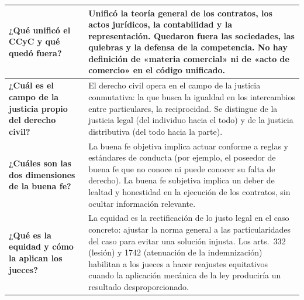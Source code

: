 \documentclass[12pt,oneside]{book}
\begin{document}
\begin{longtable}{|p{}|p{}|}
\textbf{¿Qué unificó el CCyC y qué quedó fuera?} & Unificó la teoría general de los contratos, los actos jurídicos, la contabilidad y la representación. Quedaron fuera las sociedades, las quiebras y la defensa de la competencia. No hay definición de «materia comercial» ni de «acto de comercio» en el código unificado. \\
\hline

\textbf{¿Cuál es el campo de la justicia propio del derecho civil?} & El derecho civil opera en el campo de la justicia conmutativa: la que busca la igualdad en los intercambios entre particulares, la reciprocidad. Se distingue de la justicia legal (del individuo hacia el todo) y de la justicia distributiva (del todo hacia la parte). \\
\hline

\textbf{¿Cuáles son las dos dimensiones de la buena fe?} & La buena fe objetiva implica actuar conforme a reglas y estándares de conducta (por ejemplo, el poseedor de buena fe que no conoce ni puede conocer su falta de derecho). La buena fe subjetiva implica un deber de lealtad y honestidad en la ejecución de los contratos, sin ocultar información relevante. \\
\hline

\textbf{¿Qué es la equidad y cómo la aplican los jueces?} & La equidad es la rectificación de lo justo legal en el caso concreto: ajustar la norma general a las particularidades del caso para evitar una solución injusta. Los arts.\ 332 (lesión) y 1742 (atenuación de la indemnización) habilitan a los jueces a hacer reajustes equitativos cuando la aplicación mecánica de la ley produciría un resultado desproporcionado. \\
\hline


\end{longtable}
\end{document}
